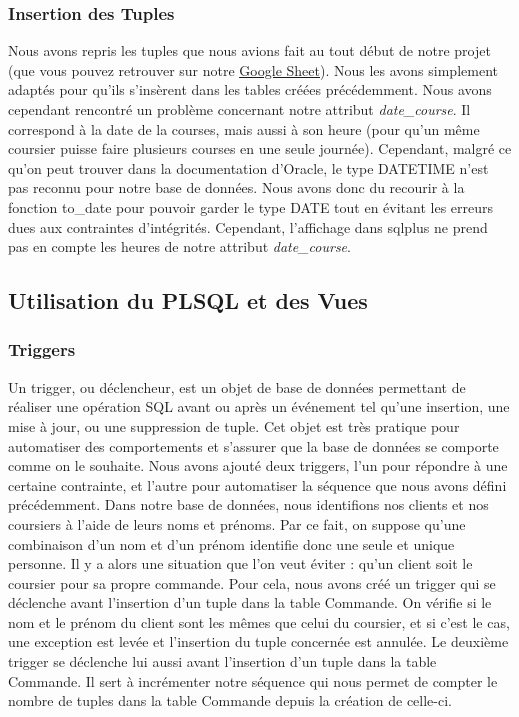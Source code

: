 \documentclass[french]{article}
\begin{document}
        \subsubsection*{Insertion des Tuples}
            Nous avons repris les tuples que nous avions fait au tout début de notre projet (que vous pouvez retrouver sur notre \href{https://docs.google.com/spreadsheets/d/1HeSNFvLN3-yMfWHoYLVumzOeQpHXJHynqVBusbvl6EQ/edit?usp=sharing}{\underline{Google Sheet}}). Nous les avons simplement adaptés pour qu'ils s'insèrent dans les tables créées précédemment.\newline
            Nous avons cependant rencontré un problème concernant notre attribut \textit{date\_course}. Il correspond à la date de la courses, mais aussi à son heure (pour qu'un même coursier puisse faire plusieurs courses en une seule journée). Cependant, malgré ce qu'on peut trouver dans la documentation d'Oracle, le type DATETIME n'est pas reconnu pour notre base de données. Nous avons donc du recourir à la fonction to\_date pour pouvoir garder le type DATE tout en évitant les erreurs dues aux contraintes d'intégrités. Cependant, l'affichage dans sqlplus ne prend pas en compte les heures de notre attribut \textit{date\_course}. 

        \subsection*{Utilisation du PLSQL et des Vues}

            \subsubsection*{Triggers}
            Un trigger, ou déclencheur, est un objet de base de données permettant de réaliser une opération SQL avant ou après un événement tel qu'une insertion, une mise à jour, ou une suppression de tuple. Cet objet est très pratique pour automatiser des comportements et s'assurer que la base de données se comporte comme on le souhaite.\newline
            Nous avons ajouté deux triggers, l'un pour répondre à une certaine contrainte, et l'autre pour automatiser la séquence que nous avons défini précédemment.\newline
            Dans notre base de données, nous identifions nos clients et nos coursiers à l'aide de leurs noms et prénoms. Par ce fait, on suppose qu'une combinaison d'un nom et d'un prénom identifie donc une seule et unique personne. Il y a alors une situation que l'on veut éviter : qu'un client soit le coursier pour sa propre commande. Pour cela, nous avons créé un trigger qui se déclenche avant l'insertion d'un tuple dans la table Commande. On vérifie si le nom et le prénom du client sont les mêmes que celui du coursier, et si c'est le cas, une exception est levée et l'insertion du tuple concernée est annulée.\newline
            Le deuxième trigger se déclenche lui aussi avant l'insertion d'un tuple dans la table Commande. Il sert à incrémenter notre séquence qui nous permet de compter le nombre de tuples dans la table Commande depuis la création de celle-ci.
            
\end{document}
